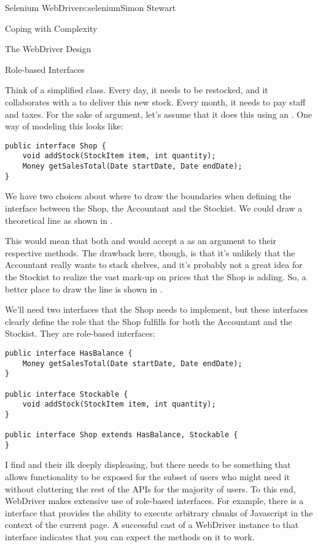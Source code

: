 \begin{aosachapter}{Selenium WebDriver}{s:selenium}{Simon Stewart}
\begin{aosasect1}{Coping with Complexity}
\begin{aosasect2}{The WebDriver Design}
\begin{aosabox}{Role-based Interfaces}

Think of a simplified  class. Every day, it needs to be
restocked, and it collaborates with a  to deliver this
new stock. Every month, it needs to pay staff and taxes. For the sake
of argument, let's assume that it does this using an
. One way of modeling this looks like:

\begin{verbatim}
public interface Shop {
    void addStock(StockItem item, int quantity);
    Money getSalesTotal(Date startDate, Date endDate);
}
\end{verbatim}

We have two choices about where to draw the boundaries when defining
the interface between the Shop, the Accountant and the Stockist. We
could draw a theoretical line as shown in .

This would mean that both  and  would
accept a  as an argument to their respective methods. The
drawback here, though, is that it's unlikely that the Accountant
really wants to stack shelves, and it's probably not a great idea for
the Stockist to realize the vast mark-up on prices that the Shop is
adding. So, a better place to draw the line is shown in
.

We'll need two interfaces that the Shop needs to implement, but these
interfaces clearly define the role that the Shop fulfills for both the
Accountant and the Stockist. They are role-based interfaces:

\begin{verbatim}
public interface HasBalance {
    Money getSalesTotal(Date startDate, Date endDate);
}

public interface Stockable {
    void addStock(StockItem item, int quantity);
}

public interface Shop extends HasBalance, Stockable {
}
\end{verbatim}
\end{aosabox}

I find  and their ilk deeply
displeasing, but there needs to be something that allows functionality
to be exposed for the subset of users who might need it without
cluttering the rest of the APIs for the majority of users. To this
end, WebDriver makes extensive use of role-based interfaces. For
example, there is a  interface that provides
the ability to execute arbitrary chunks of Javascript in the context
of the current page. A successful cast of a WebDriver instance to that
interface indicates that you can expect the methods on it to work.


\end{aosasect2}
\end{aosasect1}
\end{aosachapter}
